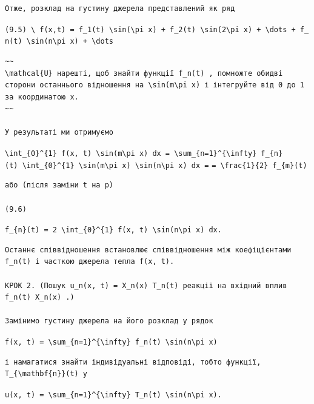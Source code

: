 \documentclass[
  ukrainian,
]{article}
\begin{document}
\begin{verbatim}
Отже, розклад на густину джерела представлений як ряд
\end{verbatim}

\texttt{(9.5)\ \textbackslash{}\ f(x,t)\ =\ f\_1(t)\ \textbackslash{}sin(\textbackslash{}pi\ x)\ +\ f\_2(t)\ \textbackslash{}sin(2\textbackslash{}pi\ x)\ +\ \textbackslash{}dots\ +\ f\_n(t)\ \textbackslash{}sin(n\textbackslash{}pi\ x)\ +\ \textbackslash{}dots}

\begin{verbatim}
~~
\mathcal{U} нарешті, щоб знайти функції f_n(t) , помножте обидві сторони останнього відношення на \sin(m\pi x) і інтегруйте від 0 до 1 за координатою x.
~~

У результаті ми отримуємо
\end{verbatim}

\texttt{\textbackslash{}int\_\{0\}\^{}\{1\}\ f(x,\ t)\ \textbackslash{}sin(m\textbackslash{}pi\ x)\ dx\ =\ \textbackslash{}sum\_\{n=1\}\^{}\{\textbackslash{}infty\}\ f\_\{n\}(t)\ \textbackslash{}int\_\{0\}\^{}\{1\}\ \textbackslash{}sin(m\textbackslash{}pi\ x)\ \textbackslash{}sin(n\textbackslash{}pi\ x)\ dx\ =}
\texttt{=\ \textbackslash{}frac\{1\}\{2\}\ f\_\{m\}(t)}

\begin{verbatim}
або (після заміни t на p)

(9.6)
\end{verbatim}

\texttt{f\_\{n\}(t)\ =\ 2\ \textbackslash{}int\_\{0\}\^{}\{1\}\ f(x,\ t)\ \textbackslash{}sin(n\textbackslash{}pi\ x)\ dx.}

\begin{verbatim}
Останнє співвідношення встановлює співвідношення між коефіцієнтами f_n(t) і часткою джерела тепла f(x, t).

КРОК 2. (Пошук u_n(x, t) = X_n(x) T_n(t) реакції на вхідний вплив f_n(t) X_n(x) .)

Замінимо густину джерела на його розклад у рядок
\end{verbatim}

\texttt{f(x,\ t)\ =\ \textbackslash{}sum\_\{n=1\}\^{}\{\textbackslash{}infty\}\ f\_n(t)\ \textbackslash{}sin(n\textbackslash{}pi\ x)}

\begin{verbatim}
і намагатися знайти індивідуальні відповіді, тобто функції, T_{\mathbf{n}}(t) у
\end{verbatim}

\texttt{u(x,\ t)\ =\ \textbackslash{}sum\_\{n=1\}\^{}\{\textbackslash{}infty\}\ T\_n(t)\ \textbackslash{}sin(n\textbackslash{}pi\ x).}
\end{document}
